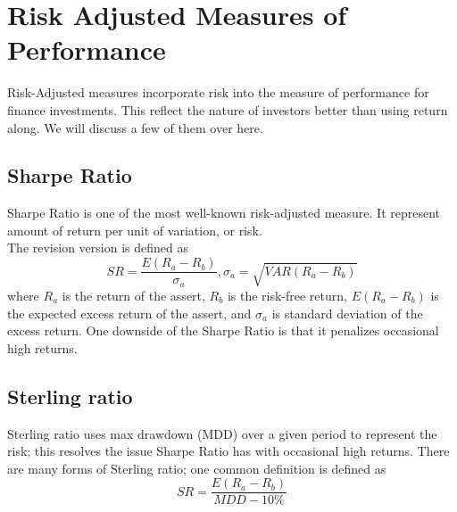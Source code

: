 \section{Risk Adjusted Measures of Performance}
Risk-Adjusted measures incorporate risk into the measure of performance for finance investments. This reflect the nature of investors better than using return along.
We will discuss a few of them over here.
\subsection{Sharpe Ratio}
Sharpe Ratio\cite{Sharpe49} is one of the most well-known risk-adjusted measure. It represent amount of return per unit of variation, or risk.\\
The revision version is defined as
\[ SR = \frac{E(R_a - R_b)}{\sigma_a},
\sigma_a = \sqrt{VAR(R_a-R_b)}\]
where \(R_a\) is the return of the assert, 
\(R_b\) is the risk-free return,
\(E(R_a - R_b)\) is the expected excess return of the assert,
and \(\sigma_a\) is standard deviation of the excess return.
One downside of the Sharpe Ratio is that it penalizes occasional high returns.\cite{9206647}
\subsection{Sterling ratio}
Sterling ratio\cite{magdon2004maximum} uses max drawdown (MDD) over a given period to represent the risk; this resolves the issue Sharpe Ratio has with occasional high returns. 
There are many forms of Sterling ratio; one common definition\cite{magdon2004maximum} is defined as 
\[ SR = \frac{E(R_a - R_b)}{MDD - 10\%}\]
